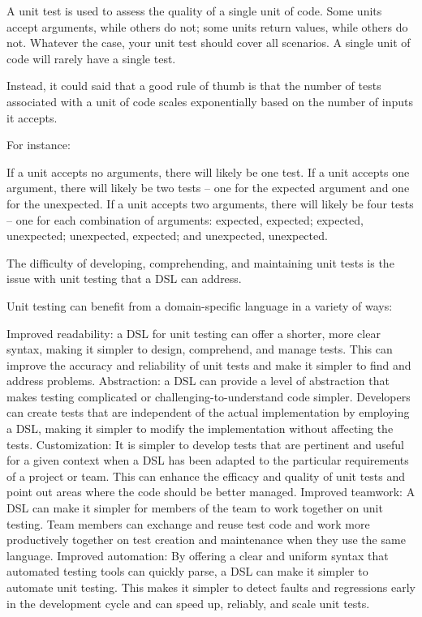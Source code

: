 A unit test is used to assess the quality of a single unit of code. Some units accept arguments, while others do not; some units return values, while others do not. Whatever the case, your unit test should cover all scenarios. A single unit of code will rarely have a single test.

Instead, it could said that a good rule of thumb is that the number of tests associated with a unit of code scales exponentially based on the number of inputs it accepts.

For instance:

If a unit accepts no arguments, there will likely be one test.
If a unit accepts one argument, there will likely be two tests – one for the expected argument and one for the unexpected.
If a unit accepts two arguments, there will likely be four tests – one for each combination of arguments: expected, expected; expected, unexpected; unexpected, expected; and unexpected, unexpected.

 The difficulty of developing, comprehending, and maintaining unit tests is the issue with unit testing that a DSL can address.
 

 Unit testing can benefit from a domain-specific language in a variety of ways:
\begin{itemize}
    \hitem Improved readability: a DSL for unit testing can offer a shorter, more clear syntax, making it simpler to design, comprehend, and manage tests. This can improve the accuracy and reliability of unit tests and make it simpler to find and address problems.
 \hitem Abstraction: a DSL can provide a level of abstraction that makes testing complicated or challenging-to-understand code simpler. Developers can create tests that are independent of the actual implementation by employing a DSL, making it simpler to modify the implementation without affecting the tests.
 \hitem Customization: It is simpler to develop tests that are pertinent and useful for a given context when a DSL has been adapted to the particular requirements of a project or team. This can enhance the efficacy and quality of unit tests and point out areas where the code should be better managed.
 \hitem Improved teamwork: A DSL can make it simpler for members of the team to work together on unit testing. Team members can exchange and reuse test code and work more productively together on test creation and maintenance when they use the same language.
 \hitem Improved automation: By offering a clear and uniform syntax that automated testing tools can quickly parse, a DSL can make it simpler to automate unit testing. This makes it simpler to detect faults and regressions early in the development cycle and can speed up, reliably, and scale unit tests.
\end{itemize}
 

